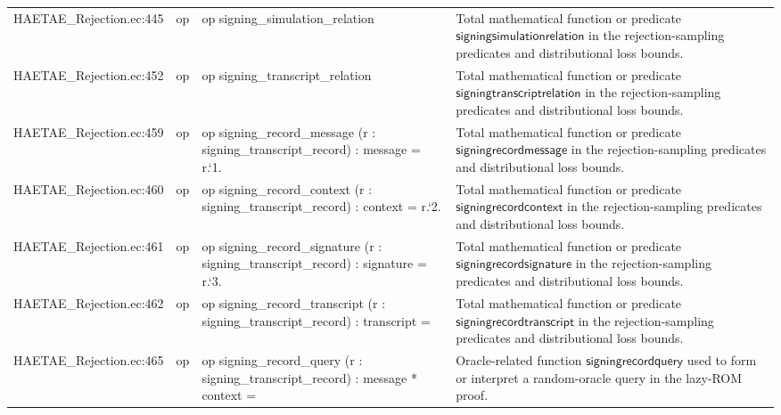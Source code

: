 \documentclass[10pt]{article}
\begin{document}
\begin{longtable}{L{0.11\textwidth}L{0.055\textwidth}L{0.385\textwidth}L{0.41\textwidth}}
HAETAE\_\allowbreak{}Rejection.\allowbreak{}ec:\allowbreak{}445 & op & {\ttfamily\scriptsize op signing\_\allowbreak{}simulation\_\allowbreak{}relation} & Total mathematical function or predicate $\mathsf{signingsimulationrelation}$ in the rejection-sampling predicates and distributional loss bounds. \\
HAETAE\_\allowbreak{}Rejection.\allowbreak{}ec:\allowbreak{}452 & op & {\ttfamily\scriptsize op signing\_\allowbreak{}transcript\_\allowbreak{}relation} & Total mathematical function or predicate $\mathsf{signingtranscriptrelation}$ in the rejection-sampling predicates and distributional loss bounds. \\
HAETAE\_\allowbreak{}Rejection.\allowbreak{}ec:\allowbreak{}459 & op & {\ttfamily\scriptsize op signing\_\allowbreak{}record\_\allowbreak{}message (r : signing\_\allowbreak{}transcript\_\allowbreak{}record) : message = r.`1.} & Total mathematical function or predicate $\mathsf{signingrecordmessage}$ in the rejection-sampling predicates and distributional loss bounds. \\
HAETAE\_\allowbreak{}Rejection.\allowbreak{}ec:\allowbreak{}460 & op & {\ttfamily\scriptsize op signing\_\allowbreak{}record\_\allowbreak{}context (r : signing\_\allowbreak{}transcript\_\allowbreak{}record) : context = r.`2.} & Total mathematical function or predicate $\mathsf{signingrecordcontext}$ in the rejection-sampling predicates and distributional loss bounds. \\
HAETAE\_\allowbreak{}Rejection.\allowbreak{}ec:\allowbreak{}461 & op & {\ttfamily\scriptsize op signing\_\allowbreak{}record\_\allowbreak{}signature (r : signing\_\allowbreak{}transcript\_\allowbreak{}record) : signature = r.`3.} & Total mathematical function or predicate $\mathsf{signingrecordsignature}$ in the rejection-sampling predicates and distributional loss bounds. \\
HAETAE\_\allowbreak{}Rejection.\allowbreak{}ec:\allowbreak{}462 & op & {\ttfamily\scriptsize op signing\_\allowbreak{}record\_\allowbreak{}transcript (r : signing\_\allowbreak{}transcript\_\allowbreak{}record) : transcript =} & Total mathematical function or predicate $\mathsf{signingrecordtranscript}$ in the rejection-sampling predicates and distributional loss bounds. \\
HAETAE\_\allowbreak{}Rejection.\allowbreak{}ec:\allowbreak{}465 & op & {\ttfamily\scriptsize op signing\_\allowbreak{}record\_\allowbreak{}query (r : signing\_\allowbreak{}transcript\_\allowbreak{}record) : message * context =} & Oracle-related function $\mathsf{signingrecordquery}$ used to form or interpret a random-oracle query in the lazy-ROM proof. \\

\end{longtable}
\end{document}

